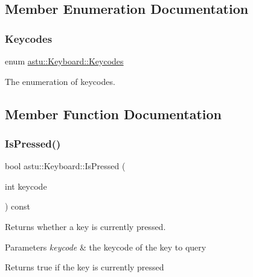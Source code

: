 \subsection{Member Enumeration Documentation}
\mbox{\label{classastu_1_1Keyboard_ac6ac295b9ef757f13ad8a70e3c38bc8c}} 
\subsubsection{\texorpdfstring{Keycodes}{Keycodes}}
{\footnotesize\ttfamily enum \hyperlink{classastu_1_1Keyboard_ac6ac295b9ef757f13ad8a70e3c38bc8c}{astu\+::\+Keyboard\+::\+Keycodes}}

The enumeration of keycodes. 

\subsection{Member Function Documentation}
\mbox{\label{classastu_1_1Keyboard_ac084da5fb7d052612fed0d465048835e}} 
\subsubsection{\texorpdfstring{Is\+Pressed()}{IsPressed()}}
{\footnotesize\ttfamily bool astu\+::\+Keyboard\+::\+Is\+Pressed (\begin{DoxyParamCaption}\item[{int}]{keycode }\end{DoxyParamCaption}) const}

Returns whether a key is currently pressed.


\begin{DoxyParams}{Parameters}
{\em keycode} & the keycode of the key to query \\
\hline
\end{DoxyParams}
\begin{DoxyReturn}{Returns}
{\ttfamily true} if the key is currently pressed 
\end{DoxyReturn}
\mbox{\label{classastu_1_1Keyboard_ad664e339aaba324018cedbab3efac9b3}} 
